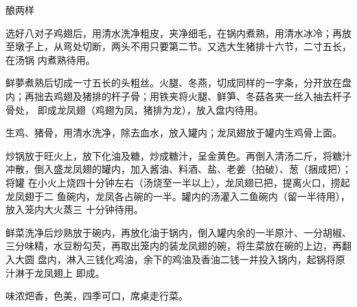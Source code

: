 \begin{recipe}[酿龙凤翅]{酿两样}

\ingredients


\preparation

\step 选好八对子鸡翅后，用清水洗净粗皮，夹净细毛，在锅内煮熟，用清水冰冷；再放
至墩子上，从弯处切断，两头不用只要第二节。又选大生猪排十六节，二寸五长，在汤锅
内煮熟待用。

\step 鲜夢煮熟后切成一寸五长的头粗丝。火腿、冬燕，切成同样的一字条，分开放在盘
内；再拙去鸡翅及猪排的杆子骨；用铁夹将火腿、鲜笋、冬菇各夹一丝入抽去杆子骨处，
即成龙凤翅（鸡翅为凤，猪排为龙），放入盘内待用。

\step 生鸡、猪骨，用清水洗净，除去血水，放入罐内；龙凤翅放于罐内生鸡骨上面。

\step 炒锅放于旺火上，放下化油及糖，炒成糖汁，呈金黄色。再倒入清汤二斤，将糖汁
冲散，倒入盛龙凤翅的罐内，加入酱油、料酒、盐、老姜（拍破）、葱（捆成把）；将罐
在小火上烧四十分钟左右（汤烧至一半以上），龙凤翅已把，提离火口，捞起龙凤翅于二
鱼碗内，龙凤各占碗的一半。罐内的汤灌入二鱼碗内（留一半待用），放入笼内大火蒸三
十分钟待用。

\step 鲜菜洗净后炒熟放于碗内，再放化油于锅内，倒入罐内余的一半原汁、一分胡椒、
三分味精，水豆粉勾芡，再取出笼内的装龙凤翅的碗，将生菜放在碗的上边，再翻入大圆
盘内，淋入三钱化鸡油，余下的鸡油及香油二钱一并投入锅内，起锅将原汁淋于龙凤翅上
即成。

\features

味浓𤆵香，色美，四季可口，席桌走行菜。

\end{recipe}

